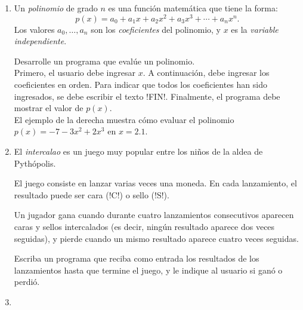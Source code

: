 \documentclass[11pt,spanish]{article}
\newcommand{\pond}[1]{[{\small\textbf{#1\%}}]}
\begin{document}
\begin{enumerate}[font=\Large\bfseries]
    \newpage
    \item
      \pond{25}
      Un \emph{polinomio} de grado \(n\)
      es una función matemática que tiene la forma:
      \[
        p(x) =
        a_0     +
        a_1 x   +
        a_2 x^2 +
        a_3 x^3 +
        \cdots +
        a_n x^n.
      \]
      Los valores \(a_0, \ldots, a_n\)
      son los \emph{coeficientes} del polinomio,
      y \(x\) es la \emph{variable independiente}.

      \begin{minipage}[t]{.63\textwidth}
        Desarrolle un programa
        que evalúe un polinomio.
        \\[1ex]
        Primero,
        el usuario debe ingresar \(x\).
        A continuación,
        debe ingresar los coeficientes en orden.
        Para indicar que todos los coeficientes han sido ingresados,
        se debe escribir el texto \li!FIN!.
        Finalmente,
        el programa debe mostrar
        el valor de \(p(x)\).
        \\[1ex]
        El ejemplo de la derecha
        muestra cómo evaluar el polinomio
        \(p(x) = -7 - 3x^2 + 2x^3\) en \(x = 2.1\).
      \end{minipage}
      \hfill
      \begin{minipage}[t]{.26\textwidth}
        
      \end{minipage}

    \newpage
    \item
      \pond{25}
      El \emph{intercalao} es un juego muy popular
      entre los niños de la aldea de Pythópolis.

      El juego consiste en lanzar varias veces una moneda.
      En cada lanzamiento,
      el resultado puede ser cara (\li!C!) o sello (\li!S!).

      Un jugador gana cuando durante cuatro lanzamientos consecutivos
      aparecen caras y sellos intercalados
      (es decir, ningún resultado aparece dos veces seguidas),
      y pierde cuando un mismo resultado aparece
      cuatro veces seguidas.

      Escriba un programa que reciba como entrada
      los resultados de los lanzamientos
      hasta que termine el juego,
      y le indique al usuario si ganó o perdió.

      \begin{minipage}[t]{.26\textwidth}
        
      \end{minipage}
      \hspace{1em}
      \begin{minipage}[t]{.26\textwidth}
        
      \end{minipage}

    \newpage
    \item
      \pond{25}

  \end{enumerate}
\end{document}
